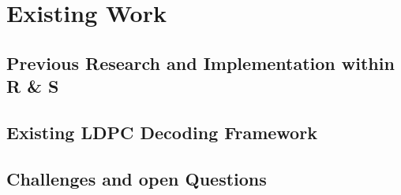 \documentclass[../main.tex]{subfiles}
\begin{document}
\chapter{Existing Work}

\section{Previous Research and Implementation within R \& S}
\label{sec:previous}

\section{Existing LDPC Decoding Framework}
\label{sec:existing}

\section{Challenges and open Questions}
\label{sec:challenges}
\end{document}
